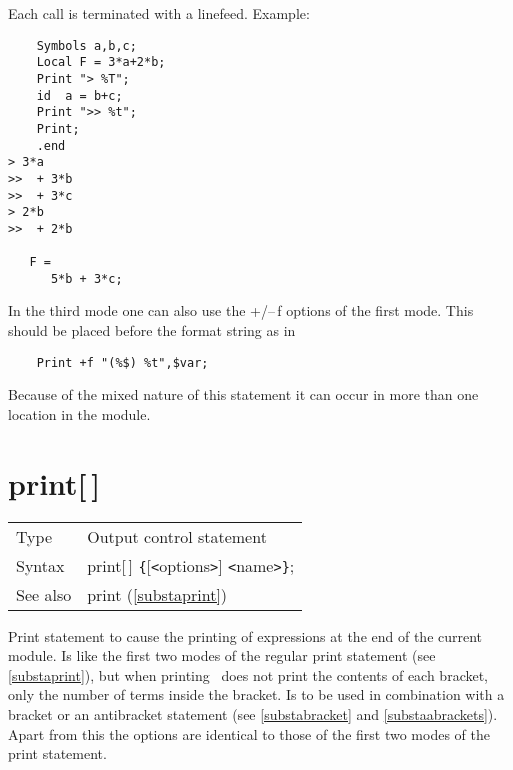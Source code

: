 
\leftvitem{1cm}{\%}


\noindent Each call is terminated with a linefeed. Example:
\begin{verbatim}
    Symbols a,b,c;
    Local F = 3*a+2*b;
    Print "> %T";
    id  a = b+c;
    Print ">> %t";
    Print;
    .end
> 3*a
>>  + 3*b
>>  + 3*c
> 2*b
>>  + 2*b

   F =
      5*b + 3*c;
\end{verbatim}

\noindent In the third mode one can also use the +/--\,f options of the 
first mode. This should be placed before the format string as in
\begin{verbatim}
    Print +f "(%$) %t",$var;
\end{verbatim}

\noindent Because of the mixed nature of this statement it can occur in 
more than one location in the module. \vspace{10mm}


\section{print[\,]}
\label{substaprintc}

\noindent \begin{tabular}{ll}
Type & Output control statement\\
Syntax & print[\,] \verb:{:[{\tt<}options{\tt>}] {\tt<}name{\tt>}\verb:}:;
\\ See also & print (\ref{substaprint})
\end{tabular}\vspace{4mm}

\noindent Print statement to cause the printing 
of expressions at the end of the current module. Is like the first two 
modes of the regular print statement (see \ref{substaprint}), but when 
printing \FORM\ does not print the contents of each bracket, 
only the number of terms inside the bracket. Is to be used in combination 
with a bracket or an antibracket statement (see 
\ref{substabracket} and \ref{substaabrackets}). Apart from this the options 
are identical to those of the first two modes of the print statement. 
\vspace{10mm}

